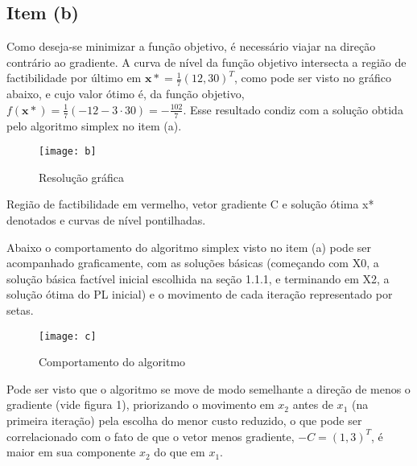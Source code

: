\documentclass[a4paper, 12pt]{article}
\begin{document}
\subsection{Item (b)}
Como deseja-se minimizar a função objetivo, é necessário viajar na direção contrário ao gradiente. A curva de nível da função objetivo intersecta a região de factibilidade por último em $\mathbf{x*}=\frac{1}{7}(12,30)^T$, como pode ser visto no gráfico abaixo, e cujo valor ótimo é, da função objetivo, $f(\mathbf{x*})=\frac{1}{7}(-12-3\cdot 30)=-\frac{102}{7}$. Esse resultado condiz com a solução obtida pelo algoritmo simplex no item (a).
\begin{table}[H]
\centering
\begin{figure}[H]
    \centering
    \caption{\label{fig:1} Resolução gráfica}
    \texttt{[image: b]}
\end{figure}
\small
Região de factibilidade em vermelho, vetor gradiente C e solução ótima x* denotados e curvas de nível pontilhadas.
\end{table}
Abaixo o comportamento do algoritmo simplex visto no item (a) pode ser acompanhado graficamente, com as soluções básicas (começando com X0, a solução básica factível inicial escolhida na seção 1.1.1, e terminando em X2, a solução ótima do PL inicial) e o movimento de cada iteração representado por setas.
\begin{table}[H]
\centering
\begin{figure}[H]
    \centering
    \caption{\label{fig:2} Comportamento do algoritmo}
    \texttt{[image: c]}
\end{figure}
\end{table}
Pode ser visto que o algoritmo se move de modo semelhante a direção de menos o gradiente (vide figura 1), priorizando o movimento em $x_2$ antes de $x_1$ (na primeira iteração) pela escolha do menor custo reduzido, o que pode ser correlacionado com o fato de que o vetor menos gradiente, $-C=(1, 3)^T$, é maior em sua componente $x_2$ do que em $x_1$.
\end{document}
